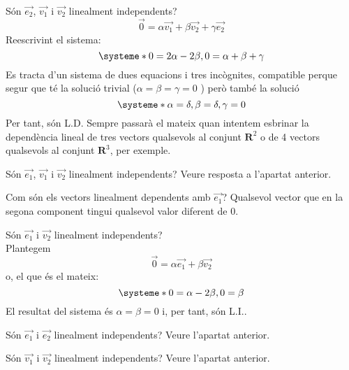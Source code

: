 \begin{llista}
  \item Són $\overrightarrow{e_2}$, $\overrightarrow{v_1}$ i $\overrightarrow{v_2}$ linealment independents?
  \[\vec{0} = \alpha \overrightarrow{v_1} + \beta \overrightarrow{v_2} + \gamma \overrightarrow{e_2}\]
  Reescrivint el sistema:
  \[
    \systeme*{0=2\alpha-2\beta, 0=\alpha+\beta+\gamma}
  \]
  Es tracta d'un sistema de dues equacions i tres incògnites, compatible perque segur que té la solució trivial ($\alpha=\beta=\gamma=0$ ) però també la solució
  \[
    \systeme*{\alpha=\delta,\beta=\delta,\gamma=0}
  \]
  Per tant, són L.D. Sempre passarà el mateix quan intentem esbrinar la dependència lineal de tres vectors qualsevols al conjunt $\mathbf{R}^2$ o de 4 vectors qualsevols al conjunt $\mathbf{R}^3$, per exemple.
  \item Són $\overrightarrow{e_1}$, $\overrightarrow{v_1}$ i $\overrightarrow{v_2}$ linealment independents?
  Veure resposta a l'apartat anterior.
  \item Com són els vectors linealment dependents amb $\overrightarrow{e_1}$?
  Qualsevol vector que en la segona component tingui qualsevol valor diferent de $0$.
  \item Són $\overrightarrow{e_1}$ i $\overrightarrow{v_2}$ linealment independents?\\
  Plantegem
  \[\vec{0} = \alpha \overrightarrow{e_1} + \beta \overrightarrow{v_2} \]
  o, el que és el mateix:
  \[
    \systeme*{0=\alpha-2\beta,0=\beta}
  \]
  El resultat del sistema és $\alpha=\beta=0$ i, per tant, són L.I..
  \item Són $\overrightarrow{e_1}$ i $\overrightarrow{e_2}$ linealment independents?
  Veure l'apartat anterior.
  \item Són $\overrightarrow{v_1}$ i $\overrightarrow{v_2}$ linealment independents?
  Veure l'apartat anterior.
\end{llista}
\blacksquare

